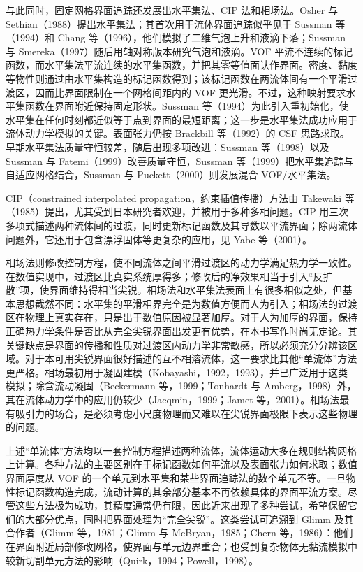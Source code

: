 \documentclass[11pt,a4paper,openany,fontset=none]{ctexbook}
\begin{document}
与此同时，固定网格界面追踪还发展出水平集法、CIP 法和相场法。Osher 与 Sethian（1988）提出水平集法；其首次用于流体界面追踪似乎见于 Sussman 等（1994）和 Chang 等（1996），他们模拟了二维气泡上升和液滴下落；Sussman 与 Smereka（1997）随后用轴对称版本研究气泡和液滴。VOF 平流不连续的标记函数，而水平集法平流连续的水平集函数，并把其零等值面认作界面。密度、黏度等物性则通过由水平集构造的标记函数得到；该标记函数在两流体间有一个平滑过渡区，因而比界面限制在一个网格间距内的 VOF 更光滑。不过，这种映射要求水平集函数在界面附近保持固定形状。Sussman 等（1994）为此引入重初始化，使水平集在任何时刻都近似等于点到界面的最短距离；这一步是水平集法成功应用于流体动力学模拟的关键。表面张力仍按 Brackbill 等（1992）的 CSF 思路求取。早期水平集法质量守恒较差，随后出现多项改进：Sussman 等（1998）以及 Sussman 与 Fatemi（1999）改善质量守恒，Sussman 等（1999）把水平集追踪与自适应网格结合，Sussman 与 Puckett（2000）则发展混合 VOF/水平集法。

CIP（constrained interpolated propagation，约束插值传播）方法由 Takewaki 等（1985）提出，尤其受到日本研究者欢迎，并被用于多种多相问题。CIP 用三次多项式描述两种流体间的过渡，同时更新标记函数及其导数以平流界面；除两流体问题外，它还用于包含漂浮固体等更复杂的应用，见 Yabe 等（2001）。

相场法则修改控制方程，使不同流体之间平滑过渡区的动力学满足热力学一致性。在数值实现中，过渡区比真实系统厚得多；修改后的净效果相当于引入“反扩散”项，使界面维持得相当尖锐。相场法和水平集法表面上有很多相似之处，但基本思想截然不同：水平集的平滑相界完全是为数值方便而人为引入；相场法的过渡区在物理上真实存在，只是出于数值原因被显著加厚。对于人为加厚的界面，保持正确热力学条件是否比从完全尖锐界面出发更有优势，在本书写作时尚无定论。其关键缺点是界面的传播和性质对过渡区内动力学非常敏感，所以必须充分分辨该区域。对于本可用尖锐界面很好描述的互不相溶流体，这一要求比其他“单流体”方法更严格。相场最初用于凝固建模（Kobayashi，1992，1993），并已广泛用于这类模拟；除含流动凝固（Beckermann 等，1999；Tonhardt 与 Amberg，1998）外，其在流体动力学中的应用仍较少（Jacqmin，1999；Jamet 等，2001）。相场法最有吸引力的场合，是必须考虑小尺度物理而又难以在尖锐界面极限下表示这些物理的问题。

上述“单流体”方法均以一套控制方程描述两种流体，流体运动大多在规则结构网格上计算。各种方法的主要区别在于标记函数如何平流以及表面张力如何求取；数值界面厚度从 VOF 的一个单元到水平集和某些界面追踪法的数个单元不等。一旦物性标记函数构造完成，流动计算的其余部分基本不再依赖具体的界面平流方案。尽管这些方法极为成功，其精度通常仍有限，因此近来出现了多种尝试，希望保留它们的大部分优点，同时把界面处理为“完全尖锐”。这类尝试可追溯到 Glimm 及其合作者（Glimm 等，1981；Glimm 与 McBryan，1985；Chern 等，1986）：他们在界面附近局部修改网格，使界面与单元边界重合；也受到复杂物体无黏流模拟中较新切割单元方法的影响（Quirk，1994；Powell，1998）。
\end{document}
